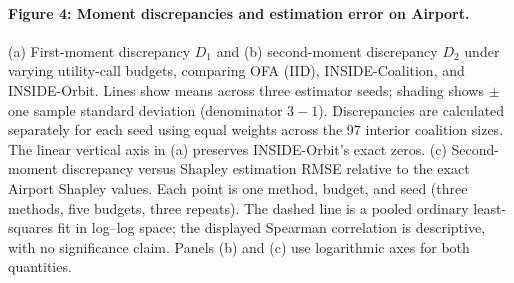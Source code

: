 \paragraph{Figure 4: Moment discrepancies and estimation error on Airport.}
(a) First-moment discrepancy $D_1$ and (b) second-moment discrepancy $D_2$
under varying utility-call budgets, comparing OFA (IID), INSIDE-Coalition,
and INSIDE-Orbit. Lines show means across three estimator seeds; shading
shows $\pm$ one sample standard deviation (denominator $3-1$). Discrepancies
are calculated separately for each seed using equal weights across the
97 interior coalition sizes. The linear vertical axis in (a) preserves
INSIDE-Orbit's exact zeros. (c) Second-moment discrepancy versus Shapley
estimation RMSE relative to the exact Airport Shapley values. Each point is
one method, budget, and seed (three methods, five budgets, three repeats).
The dashed line is a pooled ordinary least-squares fit in log--log space;
the displayed Spearman correlation is descriptive, with no significance
claim. Panels (b) and (c) use logarithmic axes for both quantities.
